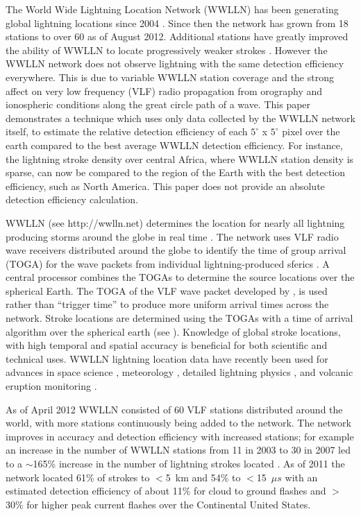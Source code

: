 The World Wide Lightning Location Network (WWLLN) has been generating global lightning locations since 2004 \citep{Rodger2006, Rodger2009}.
Since then the network has grown from 18 stations to over 60 as of August 2012.
Additional stations have greatly improved the ability of WWLLN to locate progressively weaker strokes \citep{Rodger2009, Abarca2010}.
However the WWLLN network does not observe lightning with the same detection efficiency everywhere.
This is due to variable WWLLN station coverage and the strong affect on very low frequency (VLF) radio propagation from orography and ionospheric conditions along the great circle path of a wave.
This paper demonstrates a technique which uses only data collected by the WWLLN network itself, to estimate the relative detection efficiency of each $5^\circ$ x $5^\circ$ pixel over the earth compared to the best average WWLLN detection efficiency.
For instance, the lightning stroke density over central Africa, where WWLLN station density is sparse, can now be compared to the region of the Earth with the best detection efficiency, such as North America.
This paper does not provide an absolute detection efficiency calculation.

WWLLN (see http://wwlln.net) determines the location for nearly all lightning producing storms around the globe in real time \citep{Jacobson2006c}.
The network uses VLF radio wave receivers distributed around the globe to identify the time of group arrival (TOGA) for the wave packets from individual lightning-produced sferics \citep{Dowden2002d}.
A central processor combines the TOGAs to determine the source locations over the spherical Earth.
The TOGA of the VLF wave packet developed by \citet{Dowden2000}, is used rather than ``trigger time'' to produce more uniform arrival times across the network.
Stroke locations are determined using the TOGAs with  a time of arrival algorithm over the spherical earth (see \citet{Rodger2009, Rodger2009a}).
Knowledge of global stroke locations, with high temporal and spatial accuracy is beneficial for both scientific and technical uses.
WWLLN lightning location data have recently been used for advances in space science \citep{Lay2007, Kumar2009, Collier2009, Holzworth2011, Jacobson2011}, meteorology \citep{Price2009,Thomas2010d}, detailed lightning physics \citep{Connaughton2010}, and volcanic eruption monitoring \citep{Doughton2010}.

As of April 2012 WWLLN consisted of 60 VLF stations distributed around the world, with more stations continuously being added to the network.
The network improves in accuracy and detection efficiency with increased stations; for example an increase in the number of WWLLN stations from 11 in 2003 to 30 in 2007 led to a $\sim$165\% increase in the number of lightning strokes located \citep{Rodger2009}.
As of 2011 the network located 61\% of strokes to $<$5~km and 54\% to $<$15~$\mu s$ with an estimated detection efficiency of about 11\% for cloud to ground flashes and $>$30\% for higher peak current flashes over the Continental United States\citep{Hutchins2012c, Abarca2010, Rodger2009}.

